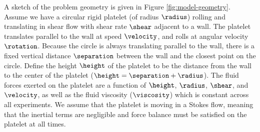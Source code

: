 A sketch of the problem geometry is given in Figure
\ref{fig:model-geometry}. Assume we have a circular rigid platelet (of
radius $\radius$) rolling and translating in shear flow with shear
rate $\shear$ adjacent to a wall. The platelet translates parallel to
the wall at speed $\velocity$, and rolls at angular velocity
$\rotation$. Because the circle is always translating parallel to the
wall, there is a fixed vertical distance $\separation$ between the
wall and the closest point on the circle. Define the height $\height$
of the platelet to be the distance from the wall to the center of the
platelet ($\height = \separation + \radius$). The fluid forces exerted
on the platelet are a function of $\height$, $\radius$, $\shear$, and
$\velocity$, as well as the fluid viscosity ($\viscosity$) which is
constant across all experiments. We assume that the platelet is moving
in a Stokes flow, meaning that the inertial terms are negligible and
force balance must be satisfied on the platelet at all times.


